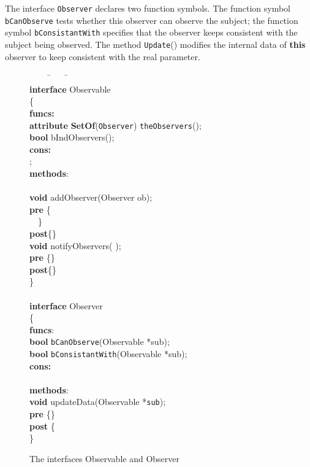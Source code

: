 \documentclass[fleqn]{llncs}
\begin{document}
The interface \texttt{Observer} declares two function symbols. The function symbol \texttt{bCanObserve} tests whether this observer
can observe the subject; the function symbol \texttt{bConsistantWith} specifies that the observer keeps consistent with the subject being observed.
The method \texttt{Update}() modifies the internal data of \textbf{this} observer to keep consistent with the real parameter.

\begin{figure}
\begin{center}
\begin{boxedminipage}{1\textwidth}
\scriptsize
\begin{tabbing}
\ \ \ \ \=\ \ \ \ \=\ \ \ \ \ \ \ \ \=\\
\textbf{interface} Observable\\
\{\\
\textbf{funcs:}\\
    \>\textbf{attribute} \textbf{SetOf}(\texttt{Observer})  \texttt{theObservers}();\\
    \>\textbf{bool} bIndObservers();\\
\textbf{cons:}\\
    \>    \>;\\
\textbf{methods}:\\
    \>  \>  \>\\
    \>\textbf{void}    addObserver(Observer ob);\\
    \>  \>\textbf{pre} \>\{\\
    \>  \>              \>\ \ \}\\
    \>  \>\textbf{post}\>\{\}\\
    \>\textbf{void}    notifyObservers( );\\
    \>  \>\textbf{pre} \>\{\}\\
    \>  \>\textbf{post}\>\{\}\\
\}\\
\\
\textbf{interface} Observer\\
\{\\
\textbf{funcs}:\\
    \>\textbf{bool} \texttt{bCanObserve}(Observable *sub);\\
    \>\textbf{bool} \texttt{bConsistantWith}(Observable *sub);\\
\textbf{cons:}\\
    \>\\
\textbf{methods}:\\
    \>\textbf{void} updateData(Observable *\texttt{sub});\\
    \>  \>\textbf{pre} \> \{\}\\
    \>  \>\textbf{post}\> \{\\
\}
\end{tabbing}
\end{boxedminipage}
\end{center}
\caption{The interfaces Observable and Observer}\label{FIG-OBSERVER-SPEC}
\end{figure}
\end{document}
